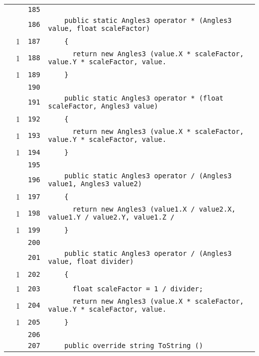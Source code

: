 \documentclass[a4paper,10pt]{article}
\begin{document}
\begin{longtable}[l]{lrrl}
\cellcolor{gray} &  & \verb~185~ & \verb~~\\
\cellcolor{gray} &  & \verb~186~ & \verb~    public static Angles3 operator * (Angles3 value, float scaleFactor)~\\
\cellcolor{green} & 1 & \verb~187~ & \verb~    {~\\
\cellcolor{green} & 1 & \verb~188~ & \verb~      return new Angles3 (value.X * scaleFactor, value.Y * scaleFactor, value.~\\
\cellcolor{green} & 1 & \verb~189~ & \verb~    }~\\
\cellcolor{gray} &  & \verb~190~ & \verb~~\\
\cellcolor{gray} &  & \verb~191~ & \verb~    public static Angles3 operator * (float scaleFactor, Angles3 value)~\\
\cellcolor{green} & 1 & \verb~192~ & \verb~    {~\\
\cellcolor{green} & 1 & \verb~193~ & \verb~      return new Angles3 (value.X * scaleFactor, value.Y * scaleFactor, value.~\\
\cellcolor{green} & 1 & \verb~194~ & \verb~    }~\\
\cellcolor{gray} &  & \verb~195~ & \verb~~\\
\cellcolor{gray} &  & \verb~196~ & \verb~    public static Angles3 operator / (Angles3 value1, Angles3 value2)~\\
\cellcolor{green} & 1 & \verb~197~ & \verb~    {~\\
\cellcolor{green} & 1 & \verb~198~ & \verb~      return new Angles3 (value1.X / value2.X, value1.Y / value2.Y, value1.Z /~\\
\cellcolor{green} & 1 & \verb~199~ & \verb~    }~\\
\cellcolor{gray} &  & \verb~200~ & \verb~~\\
\cellcolor{gray} &  & \verb~201~ & \verb~    public static Angles3 operator / (Angles3 value, float divider)~\\
\cellcolor{green} & 1 & \verb~202~ & \verb~    {~\\
\cellcolor{green} & 1 & \verb~203~ & \verb~      float scaleFactor = 1 / divider;~\\
\cellcolor{green} & 1 & \verb~204~ & \verb~      return new Angles3 (value.X * scaleFactor, value.Y * scaleFactor, value.~\\
\cellcolor{green} & 1 & \verb~205~ & \verb~    }~\\
\cellcolor{gray} &  & \verb~206~ & \verb~~\\
\cellcolor{gray} &  & \verb~207~ & \verb~    public override string ToString ()~\\

\end{longtable}
\end{document}
